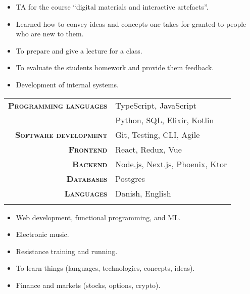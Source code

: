 \documentclass[10pt,a4paper,ragged2e,dvipsnames]{altacv}
\begin{document}
    \divider

    \begin{itemize}
      \item TA for the course ``digital materials and interactive artefacts''.
      \item Learned how to convey ideas and concepts one takes for granted to people who are new to them.
      \item To prepare and give a lecture for a class.
      \item To evaluate the students homework and provide them feedback.
    \end{itemize}

    \divider

    \begin{itemize}
      \item Development of internal systems.
    \end{itemize}

    \smallskip
    \begin{tabular}{rl}
      \makeatletter
      \textsc{\textbf{Programming languages}} & TypeScript, JavaScript \\
      & Python, SQL, Elixir, Kotlin \\
      \textsc{\textbf{Software development}} & Git, Testing, CLI, Agile \\
      \textsc{\textbf{Frontend}} & React, Redux, Vue \\
      \textsc{\textbf{Backend}} & Node.js, Next.js, Phoenix, Ktor \\
      \textsc{\textbf{Databases}} & Postgres \\
      \textsc{\textbf{Languages}} & Danish, English \\
      \makeatother
    \end{tabular}

    \smallskip
    \begin{itemize}
      \item Web development, functional programming, and ML.
      \item Electronic music.
      \item Resistance training and running.
      \item To learn things (languages, technologies, concepts, ideas).
      \item Finance and markets (stocks, options, crypto).
    \end{itemize}
\end{document}
